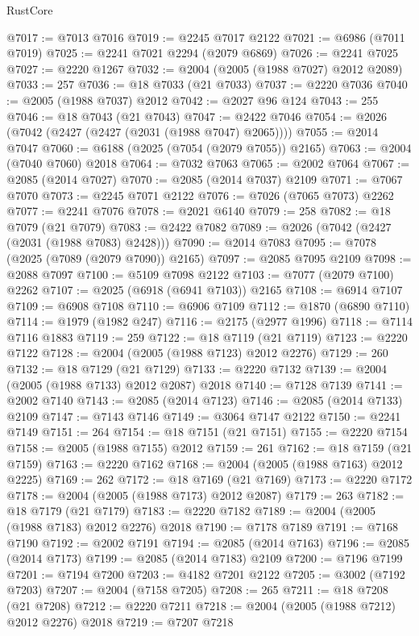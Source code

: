 \begin{lexlean}{RustCore}
\begin{coremodule}
@7017 := @7013 @7016
@7019 := @2245 @7017 @2122
@7021 := @6986 (@7011 @7019)
@7025 := @2241 @7021 @2294 (@2079 @6869)
@7026 := @2241 @7025
@7027 := @2220 @1267
@7032 := @2004 (@2005 (@1988 @7027) @2012 @2089)
@7033 := 257
@7036 := @18 @7033 (@21 @7033)
@7037 := @2220 @7036
@7040 := @2005 (@1988 @7037) @2012
@7042 := @2027 @96 @124
@7043 := 255
@7046 := @18 @7043 (@21 @7043)
@7047 := @2422 @7046
@7054 := @2026 (@7042 (@2427 (@2427 (@2031 (@1988 @7047) @2065))))
@7055 := @2014 @7047
@7060 := @6188 (@2025 (@7054 (@2079 @7055)) @2165)
@7063 := @2004 (@7040 @7060) @2018
@7064 := @7032 @7063
@7065 := @2002 @7064
@7067 := @2085 (@2014 @7027)
@7070 := @2085 (@2014 @7037) @2109
@7071 := @7067 @7070
@7073 := @2245 @7071 @2122
@7076 := @7026 (@7065 @7073) @2262
@7077 := @2241 @7076
@7078 := @2021 @6140
@7079 := 258
@7082 := @18 @7079 (@21 @7079)
@7083 := @2422 @7082
@7089 := @2026 (@7042 (@2427 (@2031 (@1988 @7083) @2428)))
@7090 := @2014 @7083
@7095 := @7078 (@2025 (@7089 (@2079 @7090)) @2165)
@7097 := @2085 @7095 @2109
@7098 := @2088 @7097
@7100 := @5109 @7098 @2122
@7103 := @7077 (@2079 @7100) @2262
@7107 := @2025 (@6918 (@6941 @7103)) @2165
@7108 := @6914 @7107
@7109 := @6908 @7108
@7110 := @6906 @7109
@7112 := @1870 (@6890 @7110)
@7114 := @1979 (@1982 @247)
@7116 := @2175 (@2977 @1996)
@7118 := @7114 @7116 @1883
@7119 := 259
@7122 := @18 @7119 (@21 @7119)
@7123 := @2220 @7122
@7128 := @2004 (@2005 (@1988 @7123) @2012 @2276)
@7129 := 260
@7132 := @18 @7129 (@21 @7129)
@7133 := @2220 @7132
@7139 := @2004 (@2005 (@1988 @7133) @2012 @2087) @2018
@7140 := @7128 @7139
@7141 := @2002 @7140
@7143 := @2085 (@2014 @7123)
@7146 := @2085 (@2014 @7133) @2109
@7147 := @7143 @7146
@7149 := @3064 @7147 @2122
@7150 := @2241 @7149
@7151 := 264
@7154 := @18 @7151 (@21 @7151)
@7155 := @2220 @7154
@7158 := @2005 (@1988 @7155) @2012
@7159 := 261
@7162 := @18 @7159 (@21 @7159)
@7163 := @2220 @7162
@7168 := @2004 (@2005 (@1988 @7163) @2012 @2225)
@7169 := 262
@7172 := @18 @7169 (@21 @7169)
@7173 := @2220 @7172
@7178 := @2004 (@2005 (@1988 @7173) @2012 @2087)
@7179 := 263
@7182 := @18 @7179 (@21 @7179)
@7183 := @2220 @7182
@7189 := @2004 (@2005 (@1988 @7183) @2012 @2276) @2018
@7190 := @7178 @7189
@7191 := @7168 @7190
@7192 := @2002 @7191
@7194 := @2085 (@2014 @7163)
@7196 := @2085 (@2014 @7173)
@7199 := @2085 (@2014 @7183) @2109
@7200 := @7196 @7199
@7201 := @7194 @7200
@7203 := @4182 @7201 @2122
@7205 := @3002 (@7192 @7203)
@7207 := @2004 (@7158 @7205)
@7208 := 265
@7211 := @18 @7208 (@21 @7208)
@7212 := @2220 @7211
@7218 := @2004 (@2005 (@1988 @7212) @2012 @2276) @2018
@7219 := @7207 @7218

\end{coremodule}
\end{lexlean}
